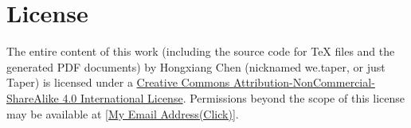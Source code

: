 \documentclass{article}
\begin{document}
\printnomenclature
\section{License}
The entire content of this work (including the source code
for TeX files and the generated PDF documents) by 
Hongxiang Chen (nicknamed we.taper, or just Taper) is
licensed under a 
\href{http://creativecommons.org/licenses/by-nc-sa/4.0/}{Creative 
Commons Attribution-NonCommercial-ShareAlike 4.0 International 
License}. Permissions beyond the scope of this 
license may be available at 
\href{http://www.google.com/recaptcha/mailhide/d?k=015LguzBJigi0rpyuJRqLoig==\&c=p1c-M-mm7ZcjUCkTuZZa9eEPHRVk6paN0694iazlQy8=}
{[My Email Address(Click)]}.
\end{document}
